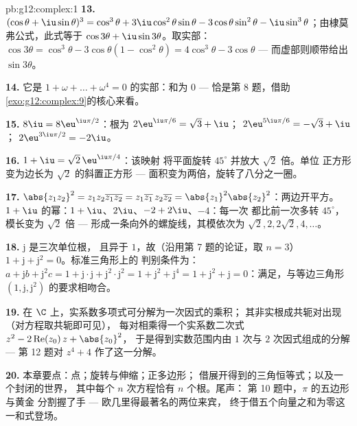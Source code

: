\begin{solution}{pb:g12:complex:1}
\textbf{13.} $(\cos\theta + \iu\sin\theta)^3 = \cos^3\theta +
3\iu\cos^2\theta\sin\theta - 3\cos\theta\sin^2\theta -
\iu\sin^3\theta$；由棣莫弗公式，此式等于
$\cos 3\theta + \iu \sin 3\theta$。取实部：
$\cos 3\theta = \cos^3\theta - 3\cos\theta(1 - \cos^2\theta)
= 4\cos^3\theta - 3\cos\theta$ --- 而虚部则顺带给出
$\sin 3\theta$。

\textbf{14.} 它是
$1 + \omega + \dots + \omega^4 = 0$ 的实部：和为 $0$ ---
恰是第 8 题，借助
\cref{exo:g12:complex:9}的核心来看。

\textbf{15.} $8\iu = 8\eu^{\iu\pi/2}$：根为
$2\eu^{\iu\pi/6} = \sqrt3 + \iu$；
$2\eu^{5\iu\pi/6} = -\sqrt3 + \iu$；
$2\eu^{3\iu\pi/2} = -2\iu$。

\textbf{16.} $1 + \iu = \sqrt2\,\eu^{\iu\pi/4}$：该映射
将平面旋转 $45^\circ$ 并放大 $\sqrt2$ 倍。单位
正方形变为边长为 $\sqrt2$ 的斜置正方形 ---
面积变为两倍，旋转了八分之一圈。

\textbf{17.} $\abs{z_1 z_2}^2 = z_1 z_2 \overline{z_1 z_2} =
z_1\overline{z_1}\, z_2\overline{z_2} =
\abs{z_1}^2\abs{z_2}^2$：两边开平方。
$1 + \iu$ 的幂：$1 + \iu$、$2\iu$、$-2 + 2\iu$、$-4$：每一次
都比前一次多转 $45^\circ$，模长变为 $\sqrt2$ 倍 ---
形成一条向外的螺旋线，其模依次为
$\sqrt2, 2, 2\sqrt2, 4, \dots$。

\textbf{18.} $\mathrm{j}$ 是三次单位根，
且异于 $1$，故（沿用第 7 题的论证，取 $n = 3$）
$1 + \mathrm{j} + \mathrm{j}^2 = 0$。标准三角形上的
判别条件为：$a + \mathrm{j}b + \mathrm{j}^2 c = 1 +
\mathrm{j}\cdot\mathrm{j} + \mathrm{j}^2 \cdot \mathrm{j}^2 =
1 + \mathrm{j}^2 + \mathrm{j}^4 = 1 + \mathrm{j}^2 +
\mathrm{j} = 0$：满足，与等边三角形
$\left(1, \mathrm{j}, \mathrm{j}^2\right)$ 的要求相吻合。

\textbf{19.} 在 $\C$ 上，实系数多项式可分解为一次因式的乘积；
其非实根成共轭对出现（对方程取共轭即可见），
每对相乘得一个实系数二次式
$z^2 - 2\operatorname{Re}(z_0)\,z + \abs{z_0}^2$，
于是得到实数范围内由 $1$ 次与 $2$ 次因式组成的分解 ---
第 12 题对 $z^4 + 4$ 作了这一分解。

\textbf{20.} 本章要点：点；旋转与伸缩；正多边形；
借展开得到的三角恒等式；以及一个封闭的世界，
其中每个 $n$ 次方程恰有 $n$ 个根。尾声：
第 10 题中，$\pi$ 的五边形与黄金
分割握了手 --- 欧几里得最著名的两位来宾，
终于借五个向量之和为零这一和式登场。
\end{solution}

